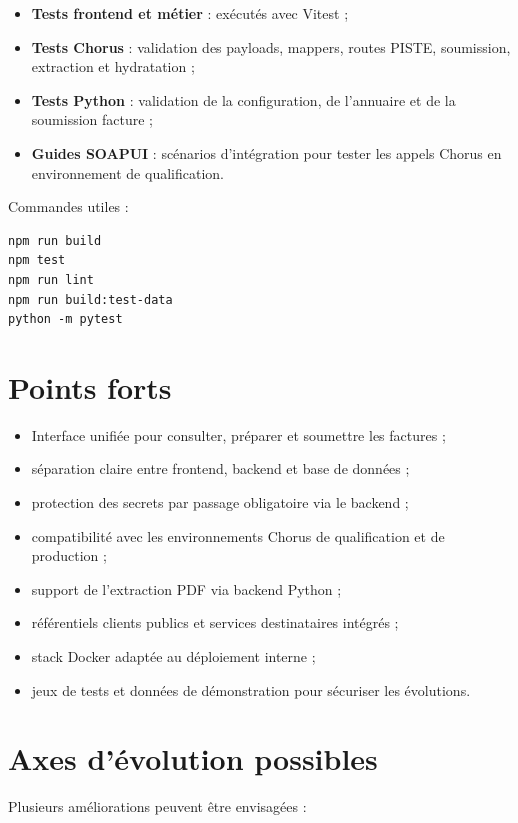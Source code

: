 \documentclass[11pt,a4paper]{article}
\begin{document}
\begin{itemize}
  \item \textbf{Tests frontend et métier} : exécutés avec Vitest ;
  \item \textbf{Tests Chorus} : validation des payloads, mappers, routes PISTE,
        soumission, extraction et hydratation ;
  \item \textbf{Tests Python} : validation de la configuration, de l'annuaire et
        de la soumission facture ;
  \item \textbf{Guides SOAPUI} : scénarios d'intégration pour tester les appels
        Chorus en environnement de qualification.
\end{itemize}

Commandes utiles :

\begin{lstlisting}
npm run build
npm test
npm run lint
npm run build:test-data
python -m pytest
\end{lstlisting}

\section{Points forts}

\begin{itemize}
  \item Interface unifiée pour consulter, préparer et soumettre les factures ;
  \item séparation claire entre frontend, backend et base de données ;
  \item protection des secrets par passage obligatoire via le backend ;
  \item compatibilité avec les environnements Chorus de qualification et de
        production ;
  \item support de l'extraction PDF via backend Python ;
  \item référentiels clients publics et services destinataires intégrés ;
  \item stack Docker adaptée au déploiement interne ;
  \item jeux de tests et données de démonstration pour sécuriser les évolutions.
\end{itemize}

\section{Axes d'évolution possibles}

Plusieurs améliorations peuvent être envisagées :
\end{document}
